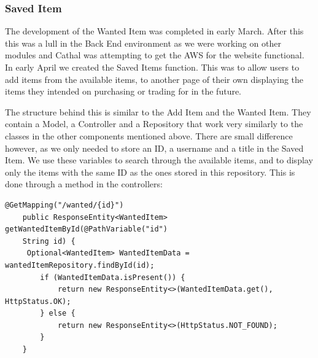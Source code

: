 \subsubsection{Saved Item}
The development of the Wanted Item was completed in early March. After this this was a lull in the Back End environment as we were working on other modules and Cathal was attempting to get the AWS for the website functional. In early April we created the Saved Items function. This was to allow users to add items from the available items, to another page of their own displaying the items they intended on purchasing or trading for in the future. \par
The structure behind this is similar to the Add Item and the Wanted Item. They contain a Model, a Controller and a Repository that work very similarly to the classes in the other components mentioned above. There are small difference however, as we only needed to store an ID, a username and a title in the Saved Item. We use these variables to search through the available items, and to display only the items with the same ID as the ones stored in this repository. This is done through a method in the controllers: \par
\begin{verbatim}
@GetMapping("/wanted/{id}")
    public ResponseEntity<WantedItem> getWantedItemById(@PathVariable("id")
    String id) {
     Optional<WantedItem> WantedItemData = wantedItemRepository.findById(id);
        if (WantedItemData.isPresent()) {
            return new ResponseEntity<>(WantedItemData.get(), HttpStatus.OK);
        } else {
            return new ResponseEntity<>(HttpStatus.NOT_FOUND);
        }
    }
\end{verbatim}
